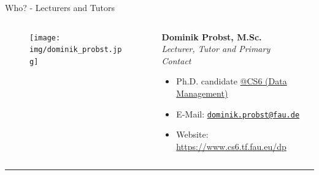 \begin{frame}{Who? - Lecturers and Tutors}

	\begin{columns}[T]
		\begin{column}{0.2\textwidth}
			\vspace{-1em}
			\begin{figure}[t]
				\centering
				\texttt{[image: img/dominik\_probst.jpg]}
			\end{figure}
		\end{column}
		\begin{column}{0.6\textwidth}
			\textbf{Dominik Probst, M.Sc.} \\
			\textit{Lecturer, Tutor and Primary Contact}
			\begin{itemize}
				\item Ph.D. candidate \href{https://www.cs6.tf.fau.eu}{@CS6 (Data Management)}
				\item E-Mail: \texttt{\href{mailto:dominik.probst@fau.de}{dominik.probst@fau.de}}
				\item Website: \url{https://www.cs6.tf.fau.eu/dp}
			\end{itemize}
		\end{column}
		\begin{column}{0.2\textwidth}
			\hfill
		\end{column}
	\end{columns}

	\vspace{1.5em}
	{\color{lightgray}\hrule}
	\vspace{2em}


\end{frame}
